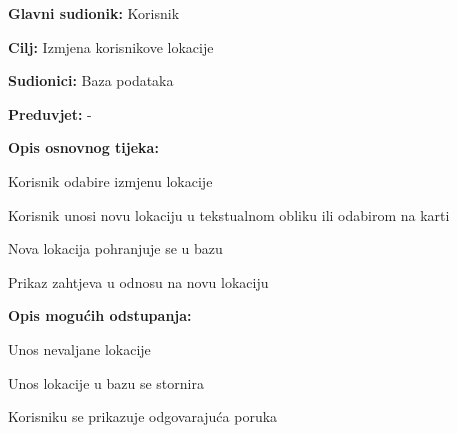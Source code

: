 				
					\noindent {}
					\begin{packed_item}
						
						\item \textbf{Glavni sudionik: }Korisnik
						\item  \textbf{Cilj:} Izmjena korisnikove lokacije
						\item  \textbf{Sudionici:} Baza podataka
						\item  \textbf{Preduvjet:} -
						\item  \textbf{Opis osnovnog tijeka:}
						
						\item[] \begin{packed_enum}
							
							\item Korisnik odabire izmjenu lokacije
							\item Korisnik unosi novu lokaciju u tekstualnom obliku ili odabirom na karti
							\item Nova lokacija pohranjuje se u bazu
							\item Prikaz zahtjeva u odnosu na novu lokaciju
						\end{packed_enum}
						
						\item  \textbf{Opis mogućih odstupanja:}
						
						\item[] \begin{packed_item}
							
							\item[3.a] Unos nevaljane lokacije
							\item[] \begin{packed_enum}
								
								\item Unos lokacije u bazu se stornira
								\item Korisniku se prikazuje odgovarajuća poruka
								
							\end{packed_enum}

						\end{packed_item}
					\end{packed_item}
				

